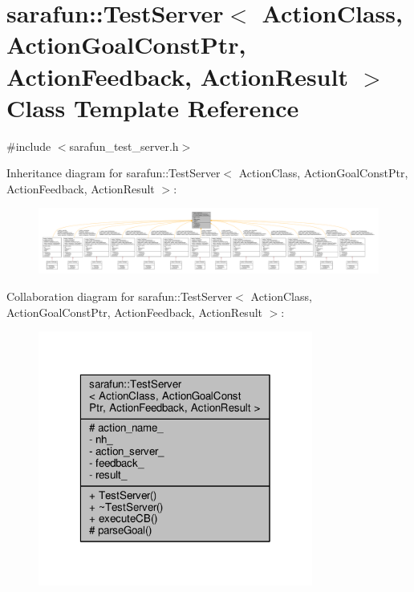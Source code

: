 \hypertarget{classsarafun_1_1TestServer}{\section{sarafun\-:\-:Test\-Server$<$ Action\-Class, Action\-Goal\-Const\-Ptr, Action\-Feedback, Action\-Result $>$ Class Template Reference}
\label{classsarafun_1_1TestServer}
}


{\ttfamily \#include $<$sarafun\-\_\-test\-\_\-server.\-h$>$}



Inheritance diagram for sarafun\-:\-:Test\-Server$<$ Action\-Class, Action\-Goal\-Const\-Ptr, Action\-Feedback, Action\-Result $>$\-:
\nopagebreak
\begin{figure}[H]
\begin{center}
\leavevmode
\includegraphics[width=350pt]{d5/dfc/classsarafun_1_1TestServer__inherit__graph}
\end{center}
\end{figure}


Collaboration diagram for sarafun\-:\-:Test\-Server$<$ Action\-Class, Action\-Goal\-Const\-Ptr, Action\-Feedback, Action\-Result $>$\-:\nopagebreak
\begin{figure}[H]
\begin{center}
\leavevmode
\includegraphics[width=256pt]{da/d4e/classsarafun_1_1TestServer__coll__graph}
\end{center}
\end{figure}
